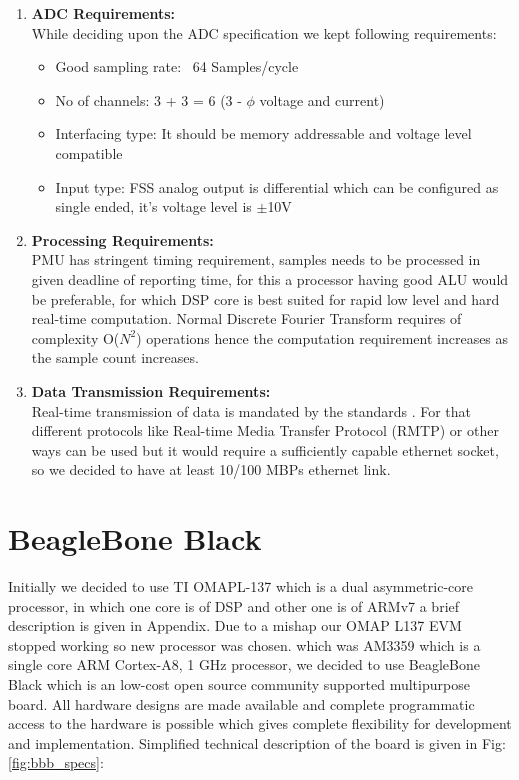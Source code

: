 \begin{enumerate}
	\item \textbf{ADC Requirements:}\\
	While deciding upon the ADC specification we kept following requirements: 
	\begin{itemize}
		\item Good sampling rate: ~64 Samples/cycle
		\item No of channels: 3 + 3 = 6 (3 - $\phi$ voltage and current) 
		\item Interfacing type: It should be memory addressable and voltage level compatible
		\item Input type: FSS analog output is differential which can be configured as single ended, it's voltage level is $\pm$10V
	\end{itemize}
	
	\item \textbf{Processing Requirements:}\\
	PMU has stringent timing requirement, samples needs to be processed in given deadline of reporting time, for this a processor having good ALU would be preferable, for which DSP core is best suited for rapid low level and hard real-time computation. Normal Discrete Fourier Transform requires of complexity O($N^{2}$) operations hence the computation requirement increases as the sample count increases. 
	
	\item \textbf{Data Transmission Requirements:}\\
	Real-time transmission of data is mandated by the standards \cite{c37.118}. For that different protocols like Real-time  Media Transfer Protocol (RMTP) or other ways can be used but it would require a sufficiently capable ethernet socket, so we decided to have at least 10/100 MBPs ethernet link.
	
\end{enumerate}

\section{BeagleBone Black}
Initially we decided to use TI OMAPL-137 which is a dual asymmetric-core processor, in which one core is of DSP and other one is of ARMv7 a brief description is given in Appendix. Due to a mishap our OMAP L137 EVM stopped working so new processor was chosen. which was AM3359 which is a single core ARM Cortex-A8, 1 GHz processor, we decided to use BeagleBone Black which is an low-cost open source community supported multipurpose board. All hardware designs are made available and complete programmatic access to the hardware is possible which gives complete flexibility for development and implementation. Simplified technical description of the board is given in Fig: \ref{fig:bbb_specs}:

